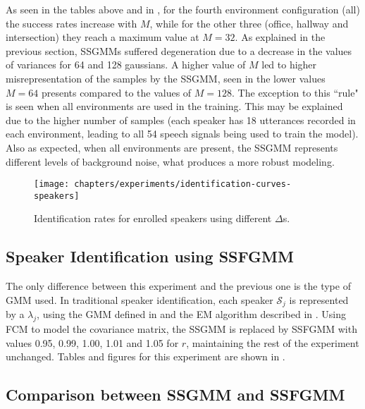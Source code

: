As seen in the tables above and in , for the fourth environment configuration (all) the success rates increase with $M$, while for the other three (office, hallway and intersection) they reach a maximum value at $M = 32$. As explained in the previous section, SSGMMs suffered degeneration due to a decrease in the values of variances for 64 and 128 gaussians. A higher value of $M$ led to higher misrepresentation of the samples by the SSGMM, seen in the lower values $M = 64$ presents compared to the values of $M = 128$. The exception to this ``rule" is seen when all environments are used in the training. This may be explained due to the higher number of samples (each speaker has 18 utterances recorded in each environment, leading to all 54 speech signals being used to train the model). Also as expected, when all environments are present, the SSGMM represents different levels of background noise, what produces a more robust modeling.

\begin{figure}[ht]
    \centering
    \texttt{[image: chapters/experiments/identification-curves-speakers]}
    \caption{Identification rates for enrolled speakers using different $\Delta$s.}
    \label{fig:identification-curves-speakers}
\end{figure}

\subsection{Speaker Identification using SSFGMM}

The only difference between this experiment and the previous one is the type of GMM used. In traditional speaker identification, each speaker $\mathcal{S}_j$ is represented by a $\lambda_j$, using the GMM defined in  and the EM algorithm described in . Using FCM to model the covariance matrix, the SSGMM is replaced by SSFGMM with values 0.95, 0.99, 1.00, 1.01 and 1.05 for $r$, maintaining the rest of the experiment unchanged. Tables and figures for this experiment are shown in .

\subsection{Comparison between SSGMM and SSFGMM}


